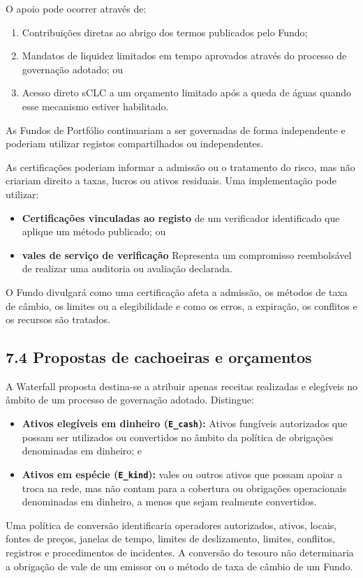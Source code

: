 \documentclass[11pt]{article}
\begin{document}
O apoio pode ocorrer através de:

\begin{enumerate}[leftmargin=*]
\item Contribuições diretas ao abrigo dos termos publicados pelo Fundo;
\item Mandatos de liquidez limitados em tempo aprovados através do processo de governação adotado; ou
\item Acesso direto sCLC a um orçamento limitado após a queda de águas quando esse mecanismo estiver habilitado.
\end{enumerate}
As Fundos de Portfólio continuariam a ser governadas de forma independente e poderiam utilizar registos compartilhados ou independentes.

As certificações poderiam informar a admissão ou o tratamento do risco, mas não criariam direito a taxas, lucros ou ativos residuais. Uma implementação pode utilizar:

\begin{itemize}[leftmargin=*]
\item \textbf{Certificações vinculadas ao registo} de um verificador identificado que aplique um método publicado; ou
\item \textbf{vales de serviço de verificação} Representa um compromisso reembolsável de realizar uma auditoria ou avaliação declarada.
\end{itemize}
O Fundo divulgará como uma certificação afeta a admissão, os métodos de taxa de câmbio, os limites ou a elegibilidade e como os erros, a expiração, os conflitos e os recursos são tratados.

\subsection*{7.4 Propostas de cachoeiras e orçamentos}

A Waterfall proposta destina-se a atribuir apenas receitas realizadas e elegíveis no âmbito de um processo de governação adotado. Distingue:

\begin{itemize}[leftmargin=*]
\item \textbf{Ativos elegíveis em dinheiro (\texttt{E\_cash}):} Ativos fungíveis autorizados que possam ser utilizados ou convertidos no âmbito da política de obrigações denominadas em dinheiro; e
\item \textbf{Ativos em espécie (\texttt{E\_kind}):} vales ou outros ativos que possam apoiar a troca na rede, mas não contam para a cobertura ou obrigações operacionais denominadas em dinheiro, a menos que sejam realmente convertidos.
\end{itemize}
Uma política de conversão identificaria operadores autorizados, ativos, locais, fontes de preços, janelas de tempo, limites de deslizamento, limites, conflitos, registros e procedimentos de incidentes. A conversão do tesouro não determinaria a obrigação de vale de um emissor ou o método de taxa de câmbio de um Fundo.
\end{document}
